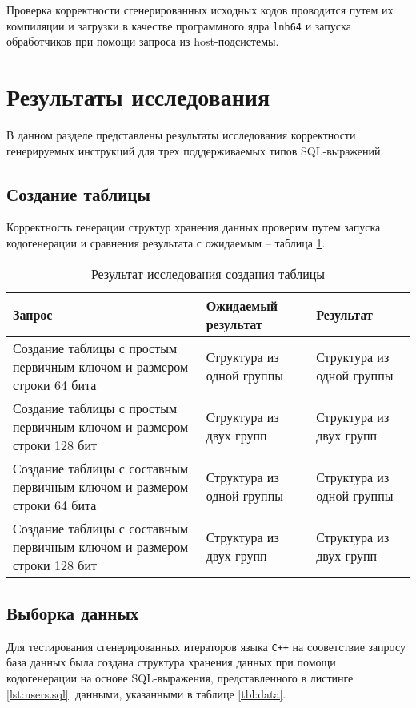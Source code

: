 Проверка корректности сгенерированных исходных кодов проводится путем их компиляции и загрузки в качестве программного ядра \texttt{lnh64} и запуска обработчиков при помощи запроса из host-подсистемы.

\section{Результаты исследования}
В данном разделе представлены результаты исследования корректности генерируемых инструкций для трех поддерживаемых типов SQL-выражений.

\subsection{Создание таблицы}
Корректность генерации структур хранения данных проверим путем запуска кодогенерации и сравнения результата с ожидаемым -- таблица \ref{tbl:research_create}.

\begin{table}[H]
	\caption{Результат исследования создания таблицы}
	\label{tbl:research_create}
	\begin{tabular}{|p{6.5cm}|p{3.3cm}|p{3.3cm}|}
		\hline
		Запрос & Ожидаемый результат & Результат \\ \hline
		Создание таблицы с простым первичным ключом и размером строки 64 бита & Структура из одной группы & Структура из одной группы \\ \hline
		Создание таблицы с простым первичным ключом и размером строки 128 бит & Структура из двух групп & Структура из двух групп \\ \hline
		Создание таблицы с составным первичным ключом и размером строки 64 бита & Структура из одной группы & Структура из одной группы \\ \hline
		Создание таблицы с составным первичным ключом и размером строки 128 бит & Структура из двух групп & Структура из двух групп \\ \hline
	\end{tabular}
\end{table}

\subsection{Выборка данных}
Для тестирования сгенерированных итераторов языка \texttt{C++} на сооветствие запросу база данных была создана структура хранения данных при помощи кодогенерации на основе SQL-выражения, представленного в листинге \ref{lst:users.sql}. данными, указанными в таблице \ref{tbl:data}.

